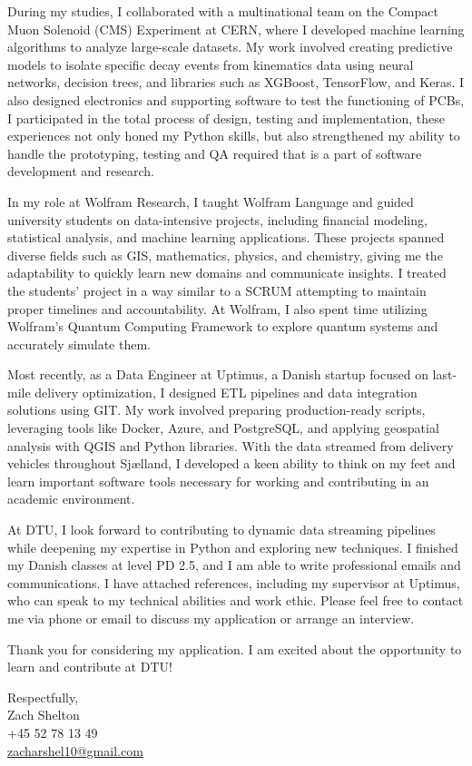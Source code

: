 \documentclass[11pt,a4]{article}
\begin{document}
During my studies, I collaborated with a multinational team on the Compact Muon Solenoid (CMS) Experiment at CERN, where I developed machine learning algorithms to analyze large-scale datasets. My work involved creating predictive models to isolate specific decay events from kinematics data using neural networks, decision trees, and libraries such as XGBoost, TensorFlow, and Keras. I also designed electronics and supporting software to test the functioning of PCBs, I participated in the total process of design, testing and implementation, these experiences not only honed my Python skills, but also strengthened my ability to handle the prototyping, testing and QA required that is a part of software development and research.

In my role at Wolfram Research, I taught Wolfram Language and guided university students on data-intensive projects, including financial modeling, statistical analysis, and machine learning applications. These projects spanned diverse fields such as GIS, mathematics, physics, and chemistry, giving me the adaptability to quickly learn new domains and communicate insights. I treated the students' project in a way similar to a SCRUM attempting to maintain proper timelines and accountability. At Wolfram, I also spent time utilizing Wolfram's Quantum Computing Framework to explore quantum systems and accurately simulate them.

Most recently, as a Data Engineer at Uptimus, a Danish startup focused on last-mile delivery optimization, I designed ETL pipelines and data integration solutions using GIT. My work involved preparing production-ready scripts, leveraging tools like Docker, Azure, and PostgreSQL, and applying geospatial analysis with QGIS and Python libraries. With the data streamed from delivery vehicles throughout Sjælland, I developed a keen ability to think on my feet and learn important software tools necessary for working and contributing in an academic environment.

At DTU, I look forward to contributing to dynamic data streaming pipelines while deepening my expertise in Python and exploring new techniques. I finished my Danish classes at level PD 2.5, and I am able to write professional emails and communications. I have attached references, including my supervisor at Uptimus, who can speak to my technical abilities and work ethic. Please feel free to contact me via phone or email to discuss my application or arrange an interview.

Thank you for considering my application. I am excited about the opportunity to learn and contribute at DTU!

\vspace{0.5cm}
\raggedright
Respectfully, \\ Zach Shelton \\ +45 52 78 13 49 \\ 
\href{mailto:zshelton1997@gmail.com}{zacharshel10@gmail.com} 
\end{document}
